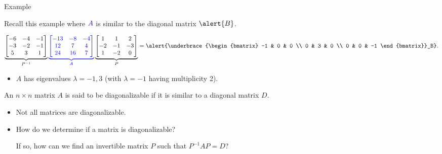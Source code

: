 \documentclass[xcolor=dvipsnames,aspectratio=169,t]{beamer}
\begin{document}
\begin{frame}{Example}
  \medskip

  Recall this example where $\textcolor{blue}{A}$ is \alert{similar} to the diagonal matrix $\alert{B}$.

  \[  \underbrace{\begin{bmatrix} -6 & -4 & -1 \\ -3 & -2 & -1 \\ 5 & 3 & 1 \end{bmatrix}}_{P^{-1}}
  \colorb{\underbrace{\begin{bmatrix} -13 & -8 & -4 \\ 12 & 7 & 4 \\ 24 & 16 & 7 \end{bmatrix}}_A }
  \underbrace{\begin{bmatrix} 1 & 1 & 2 \\ -2 & -1 & -3 \\ 1 & -2 & 0 \end{bmatrix}}_P  =
  \alert{\underbrace{\begin{bmatrix} -1 & 0 & 0 \\ 0 & 3 & 0 \\ 0 & 0 & -1 \end{bmatrix}}_B}. \]

  \begin{itemize}
  \item $A$ has \alert{eigenvalues} $\lambda = -1 ,3$ (with $\lambda = -1$ having multiplicity 2).
  \end{itemize}
  \smallskip
  
  \pause
  \begin{definition}
    An $n \times n$  matrix $A$ is said to be \alert{diagonalizable} if it is similar to a diagonal matrix $D$.
  \end{definition}

  \begin{itemize}
  \item Not all matrices are diagonalizable.
  \item How do we determine if a matrix is diagonalizable?
  
        If so, how can we find an invertible matrix $P$ such that $P^{-1}AP=D$?
  \end{itemize}
\end{frame}
\end{document}
